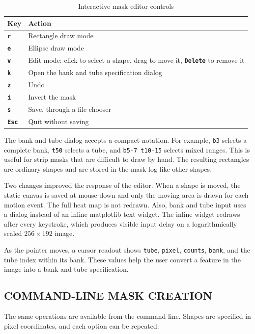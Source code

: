 \documentclass[tm]{ornltm}
\newcommand{\key}[1]{\textbf{\texttt{#1}}}
\begin{document}
\begin{table}[ht]
  \centering
  \caption{Interactive mask editor controls}
  \label{tab:maskkeys}
  \small
  \begin{tabular}{l p{}}
    \toprule
    Key & Action \\
    \midrule
    \key{r} & Rectangle draw mode \\
    \key{e} & Ellipse draw mode \\
    \key{v} & Edit mode: click to select a shape, drag to move it, \key{Delete}
      to remove it \\
    \key{k} & Open the bank and tube specification dialog \\
    \key{z} & Undo \\
    \key{i} & Invert the mask \\
    \key{s} & Save, through a file chooser \\
    \key{Esc} & Quit without saving \\
    \bottomrule
  \end{tabular}
\end{table}

The bank and tube dialog accepts a compact notation. For example,
\texttt{b3} selects a complete bank, \texttt{t50} selects a tube, and
\texttt{b5-7 t10-15} selects mixed ranges. This is useful for strip masks that
are difficult to draw by hand. The resulting rectangles are ordinary shapes and
are stored in the mask log like other shapes.

Two changes improved the response of the editor. When a shape is moved, the
static canvas is saved at mouse-down and only the moving area is drawn for each
motion event. The full heat map is not redrawn. Also, bank and tube input uses a
dialog instead of an inline matplotlib text widget. The inline widget redraws
after every keystroke, which produces visible input delay on a logarithmically
scaled $256\times192$ image.

As the pointer moves, a cursor readout shows \texttt{tube}, \texttt{pixel},
\texttt{counts}, \texttt{bank}, and the tube index within its bank. These values
help the user convert a feature in the image into a bank and tube specification.

\subsection{COMMAND-LINE MASK CREATION}

The same operations are available from the command line. Shapes are specified in
pixel coordinates, and each option can be repeated:
\end{document}
